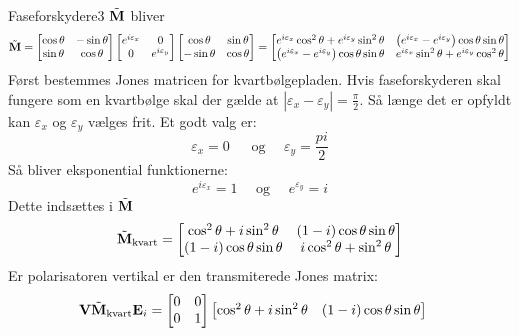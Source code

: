 \begin{opgave}{Faseforskydere}{3}
\opg $\tilde{\mathbf{M}}$ bliver
\begin{equation*}
\tilde{\mathbf{M}} = 
\begin{bmatrix}
\cos\theta & -\sin\theta \\
\sin\theta & \cos\theta \\
\end{bmatrix}
\begin{bmatrix}
e^{i\varepsilon_x} & 0 \\
0 & e^{i\varepsilon_y} \\
\end{bmatrix}
\begin{bmatrix}
\cos\theta & \sin\theta \\
-\sin\theta & \cos\theta \\
\end{bmatrix}
=
\begin{bmatrix}
e^{i\varepsilon_x} \cos^2 \theta + e^{i\varepsilon_y} \sin^2 \theta & \left( e^{i\varepsilon_x}-e^{i\varepsilon_y} \right)\cos\theta\sin\theta \\
\left( e^{i\varepsilon_x}-e^{i\varepsilon_y} \right)\cos\theta\sin\theta & e^{i\varepsilon_x} \sin^2 \theta + e^{i\varepsilon_y} \cos^2 \theta \\
\end{bmatrix}
\end{equation*}
\opg Først bestemmes Jones matricen for kvartbølgepladen. 
Hvis faseforskyderen skal fungere som en kvartbølge skal der gælde at $|\varepsilon_x-\varepsilon_y| = \frac{\pi}{2}$. Så længe det er opfyldt kan $\varepsilon_x$ og $\varepsilon_y$ vælges frit.
Et godt valg er:
$$
\varepsilon_x = 0~~~~~~~\text{og}~~~~~~\varepsilon_y = \frac{pi}{2}
$$
Så bliver eksponential funktionerne:
$$
e^{i\varepsilon_x} = 1~~~~~~\text{og} ~~~~~~e^{\varepsilon_y} = i
$$
Dette indsættes i $\tilde{\mathbf{M}}$
$$
\tilde{\mathbf{M}}_\text{kvart} = \begin{bmatrix}
\cos^2 \theta+i\sin^2\theta&(1-i)\cos\theta\sin\theta\\
(1-i)\cos\theta\sin\theta & i\cos^2\theta+\sin^2\theta
\end{bmatrix}
$$
Er polarisatoren vertikal er den transmiterede Jones matrix:
\begin{align*}
\mathbf{V} \tilde{\mathbf{M}}_\text{kvart}\mathbf{E}_i&=\begin{bmatrix}
0&0\\0&1
\end{bmatrix}\begin{bmatrix}
\cos^2 \theta+i\sin^2\theta&(1-i)\cos\theta\sin\theta\\

\end{bmatrix}
\end{align*}
\end{opgave}
